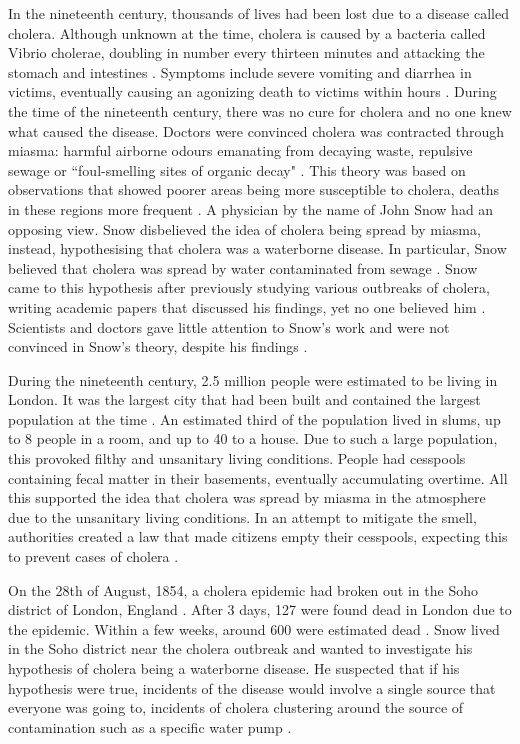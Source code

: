 \documentclass[12pt]{article}
\begin{document}
In the nineteenth century, thousands of lives had been lost due to a disease called cholera. Although unknown at the time, cholera is caused by a bacteria called Vibrio cholerae, doubling in number every thirteen minutes and attacking the stomach and intestines \cite{channel1}. Symptoms include severe vomiting and diarrhea in victims, eventually causing an agonizing death to victims within hours \cite{heros, channel1}. During the time of the nineteenth century, there was no cure for cholera and no one knew what caused the disease. Doctors were convinced cholera was contracted through miasma: harmful airborne odours emanating from decaying waste, repulsive sewage or ``foul-smelling sites of organic decay" \cite{ucla, test}. This theory was based on observations that showed poorer areas being more susceptible to cholera, deaths in these regions more frequent \cite{heros}. A physician by the name of John Snow had an opposing view. Snow disbelieved the idea of cholera being spread by miasma, instead, hypothesising that cholera was a waterborne disease. In particular, Snow believed that cholera was spread by water contaminated from sewage \cite{ucla}. Snow came to this hypothesis after previously studying various outbreaks of cholera, writing academic papers that discussed his findings, yet no one believed him \cite{original}. Scientists and doctors gave little attention to Snow's work and were not convinced in Snow's theory, despite his findings \cite{ucla}. 

During the nineteenth century, 2.5 million people were estimated to be living in London. It was the largest city that had been built and contained the largest population at the time \cite{channel1, tedtalk}. An estimated third of the population lived in slums, up to 8 people in a room, and up to 40 to a house. Due to such a large population, this provoked filthy and unsanitary living conditions. People had cesspools containing fecal matter in their basements, eventually accumulating overtime. All this supported the idea that cholera was spread by miasma in the atmosphere due to the unsanitary living conditions. In an attempt to mitigate the smell, authorities created a law that made citizens empty their cesspools, expecting this to prevent cases of cholera \cite{tedtalk, johnson}. 

On the 28th of August, 1854, a cholera epidemic had broken out in the Soho district of London, England \cite{tedtalk}. After 3 days, 127 were found dead in London due to the epidemic. Within a few weeks, around 600 were estimated dead \cite{youtube, tedtalk}. Snow lived in the Soho district near the cholera outbreak and wanted to investigate his hypothesis of cholera being a waterborne disease. He suspected that if his hypothesis were true, incidents of the disease would involve a single source that everyone was going to, incidents of cholera clustering around the source of contamination such as a specific water pump \cite{test, tedtalk, johnson}. 
\end{document}
